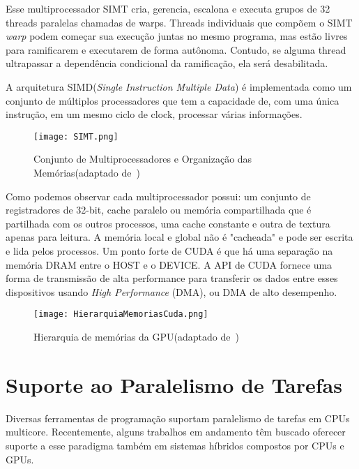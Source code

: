 Esse multiprocessador SIMT cria, gerencia, escalona e executa grupos de 32 threads paralelas chamadas de warps. Threads individuais que compõem o SIMT \textit{warp} podem começar sua execução juntas no mesmo programa, mas estão livres para ramificarem e executarem de forma autônoma. Contudo, se alguma thread ultrapassar a dependência condicional da ramificação, ela será desabilitada. 

A arquitetura SIMD(\textit{Single Instruction Multiple Data}) é implementada como um conjunto de múltiplos processadores que tem a capacidade de, com uma única instrução, em um mesmo ciclo de clock, processar várias informações.

\begin{figure}[!htb]
	\begin{center}
	\centering
			\texttt{[image: SIMT.png]}
	\label{fig: SIMT}
	\caption{Conjunto de Multiprocessadores e Organização das Memórias(adaptado de~\citep{cuda})}
	\end{center}
\end{figure}

Como podemos observar cada multiprocessador possui: um conjunto de registradores de 32-bit, cache paralelo ou memória compartilhada que é partilhada com os outros processos, uma cache constante e outra de textura apenas para leitura. A memória local e global não é "cacheada" e pode ser escrita e lida pelos processos.
Um ponto forte de CUDA é que há uma separação na memória DRAM entre o HOST e o DEVICE. A API de CUDA fornece uma forma de transmissão de alta performance para transferir os dados entre esses dispositivos usando \textit{High Performance} (DMA), ou DMA de alto desempenho.

\begin{figure}[!htb]
	\begin{center}
	\centering
			\texttt{[image: HierarquiaMemoriasCuda.png]}
	\label{fig: HierarquiaMemoriasCuda}
	\caption{Hierarquia de memórias da GPU(adaptado de~\citep{cuda})}
	\end{center}
\end{figure}


\section{Suporte ao Paralelismo de Tarefas}
Diversas ferramentas de programação suportam paralelismo de tarefas em CPUs multicore. Recentemente, alguns trabalhos em andamento têm buscado oferecer suporte a esse paradigma também em sistemas híbridos compostos por CPUs e GPUs.





